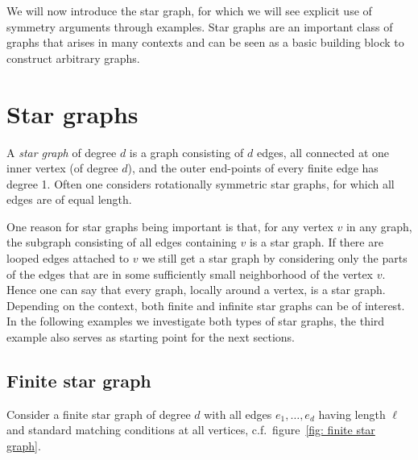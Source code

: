 We will now introduce the star graph, for which we will see explicit use of symmetry arguments through examples. Star graphs are an important class of graphs that arises in many contexts and can be seen as a basic building block to construct arbitrary graphs.



\section{Star graphs}\label{sec: star graph}

A \emph{star graph} of degree $d$ is a graph consisting of $d$ edges, all connected at one inner vertex (of degree $d$), and the outer end-points of every finite edge has degree 1. Often one considers rotationally symmetric star graphs, for which all edges are of equal length.

One reason for star graphs being important is that, for any vertex $v$ in any graph, the subgraph consisting of all edges containing $v$ is a star graph. If there are looped edges attached to $v$ we still get a star graph by considering only the parts of the edges that are in some sufficiently small neighborhood of the vertex $v$. Hence one can say that every graph, locally around a vertex, is a star graph. Depending on the context, both finite and infinite star graphs can be of interest. In the following examples we investigate both types of star graphs, the third example also serves as starting point for the next sections.



\subsection{Finite star graph}\label{sec: finite star graph}

Consider a finite star graph of degree $d$ with all edges $e_1, \ldots, e_d$ having length $\ell$ and standard matching conditions at all vertices, c.f.\ figure~\ref{fig: finite star graph}.

